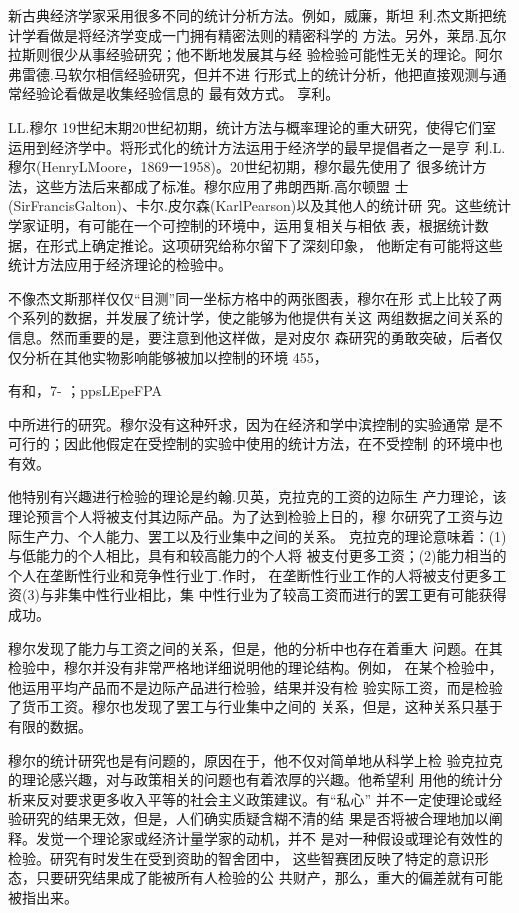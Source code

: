 新古典经济学家采用很多不同的统计分析方法。例如，威廉，斯坦
利.杰文斯把统计学看做是将经济学变成一门拥有精密法则的精密科学的
方法。另外，莱昂.瓦尔拉斯则很少从事经验研究；他不断地发展其与经
验检验可能性无关的理论。阿尔弗雷德.马软尔相信经验研究，但并不进
行形式上的统计分析，他把直接观测与通常经验论看做是收集经验信息的
最有效方式。
享利。

LL.穆尔
19世纪末期20世纪初期，统计方法与概率理论的重大研究，使得它们室
运用到经济学中。将形式化的统计方法运用于经济学的最早提倡者之一是亨
利.L.穆尔(HenryLMoore，1869一1958)。20世纪初期，穆尔最先使用了
很多统计方法，这些方法后来都成了标准。穆尔应用了弗朗西斯.高尔顿盟
士(SirFrancisGalton)、卡尔.皮尔森(KarlPearson)以及其他人的统计研
究。这些统计学家证明，有可能在一个可控制的环境中，运用复相关与相依
表，根据统计数据，在形式上确定推论。这项研究给称尔留下了深刻印象，
他断定有可能将这些统计方法应用于经济理论的检验中。

不像杰文斯那样仅仅“目测”同一坐标方格中的两张图表，穆尔在形
式上比较了两个系列的数据，并发展了统计学，使之能够为他提供有关这
两组数据之间关系的信息。然而重要的是，要注意到他这样做，是对皮尔
森研究的勇敢突破，后者仅仅分析在其他实物影响能够被加以控制的环境
455，


有和，7-
；ppsLEpeFPA


中所进行的研究。穆尔没有这种歼求，因为在经济和学中滨控制的实验通常
是不可行的；因此他假定在受控制的实验中使用的统计方法，在不受控制
的环境中也有效。

他特别有兴趣进行检验的理论是约翰.贝英，克拉克的工资的边际生
产力理论，该理论预言个人将被支付其边际产品。为了达到检验上日的，穆
尔研究了工资与边际生产力、个人能力、罢工以及行业集中之间的关系。
克拉克的理论意味着：(1)与低能力的个人相比，具有和较高能力的个人将
被支付更多工资；(2)能力相当的个人在垄断性行业和竞争性行业丁.作时，
在垄断性行业工作的人将被支付更多工资(3)与非集中性行业相比，集
中性行业为了较高工资而进行的罢工更有可能获得成功。

穆尔发现了能力与工资之间的关系，但是，他的分析中也存在着重大
问题。在其检验中，穆尔并没有非常严格地详细说明他的理论结构。例如，
在某个检验中，他运用平均产品而不是边际产品进行检验，结果并没有检
验实际工资，而是检验了货币工资。穆尔也发现了罢工与行业集中之间的
关系，但是，这种关系只基于有限的数据。

穆尔的统计研究也是有问题的，原因在于，他不仅对简单地从科学上检
验克拉克的理论感兴趣，对与政策相关的问题也有着浓厚的兴趣。他希望利
用他的统计分析来反对要求更多收入平等的社会主义政策建议。有“私心”
并不一定使理论或经验研究的结果无效，但是，人们确实质疑含糊不清的结
果是否将被合理地加以阐释。发觉一个理论家或经济计量学家的动机，并不
是对一种假设或理论有效性的检验。研究有时发生在受到资助的智舍团中，
这些智赛团反映了特定的意识形态，只要研究结果成了能被所有人检验的公
共财产，那么，重大的偏差就有可能被指出来。


